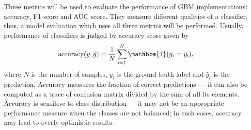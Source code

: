 \documentclass[magisterska, english]{pwr_wmat_praca_dyplomowa}
\theoremstyle{plain}
\numberwithin{theorem}{chapter}
\theoremstyle{definition}
\numberwithin{theorem}{chapter}
\begin{document}
Three metrics will be used to evaluate the performance of GBM implementations: accuracy, F1 score and AUC score. They measure different qualities of a classifier, thus, a model evaluation which uses all three metrics will be performed. Usually, performance of classifiers is judged by accuracy score \cite{sklearn} given by
\begin{equation}
    \mathrm{accuracy}(y, \hat{y}) = \frac 1N \sum_{i=1}^N \mathbbm{1}(y_i = \hat{y}_i),
\end{equation}
where $N$ is the number of samples, $y_i$ is the ground truth label and $\hat{y}_i$ is the prediction. Accuracy measures the fraction of correct predictions --- it can also be computed as a trace of confusion matrix divided by the sum of all its elements. Accuracy is sensitive to class distribution --- it may not be an appropriate performance measure when the classes are not balanced; in such cases, accuracy may lead to overly optimistic results.
\end{document}
